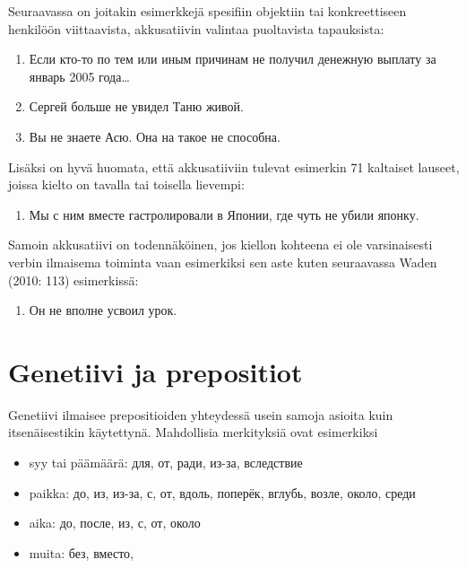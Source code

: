 \documentclass[]{scrreprt}
\providecommand{\tightlist}{%
  \setlength{\itemsep}{0pt}\setlength{\parskip}{0pt}}
\begin{document}
Seuraavassa on joitakin esimerkkejä spesifiin objektiin tai
konkreettiseen henkilöön viittaavista, akkusatiivin valintaa puoltavista
tapauksista:

\begin{enumerate}
\def\labelenumi{(\arabic{enumi})}
\setcounter{enumi}{67}
\tightlist
\item
  Если кто-то по тем или иным причинам не получил денежную выплату за
  январь 2005 года\ldots{}
\item
  Сергей больше не увидел Таню живой.
\item
  Вы не знаете Асю. Она на такое не способна.
\end{enumerate}

Lisäksi on hyvä huomata, että akkusatiiviin tulevat esimerkin 71
kaltaiset lauseet, joissa kielto on tavalla tai toisella lievempi:

\begin{enumerate}
\def\labelenumi{(\arabic{enumi})}
\setcounter{enumi}{70}
\tightlist
\item
  Мы с ним вместе гастролировали в Японии, где чуть не убили японку.
\end{enumerate}

Samoin akkusatiivi on todennäköinen, jos kiellon kohteena ei ole
varsinaisesti verbin ilmaisema toiminta vaan esimerkiksi sen aste kuten
seuraavassa Waden (2010: 113) esimerkissä:

\begin{enumerate}
\def\labelenumi{(\arabic{enumi})}
\setcounter{enumi}{71}
\tightlist
\item
  Он не вполне усвоил урок.
\end{enumerate}

\section{Genetiivi ja prepositiot}\label{genetiivi-ja-prepositiot}

Genetiivi ilmaisee prepositioiden yhteydessä usein samoja asioita kuin
itsenäisestikin käytettynä. Mahdollisia merkityksiä ovat esimerkiksi

\begin{itemize}
\tightlist
\item
  syy tai päämäärä: для, от, ради, из-за, вследствие
\item
  paikka: до, из, из-за, с, от, вдоль, поперёк, вглубь, возле, около,
  среди
\item
  aika: до, после, из, с, от, около
\item
  muita: без, вместо,
\end{itemize}
\end{document}
